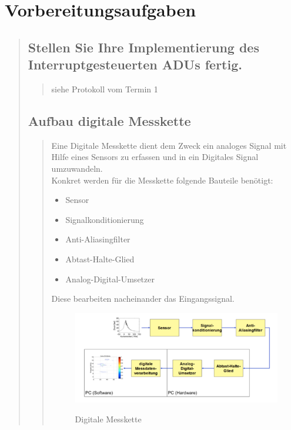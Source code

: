 \section{Vorbereitungsaufgaben}
\begin{quote}
    \subsection{Stellen Sie Ihre Implementierung des Interruptgesteuerten ADUs fertig.}
    \begin{quote}
        siehe Protokoll vom Termin 1
    \end{quote}
    
	\subsection{Aufbau digitale Messkette}
    \begin{quote}
        Eine Digitale Messkette dient dem Zweck ein analoges Signal mit Hilfe eines Sensors zu erfassen und in ein
        Digitales Signal umzuwandeln.\\
        Konkret werden für die Messkette folgende Bauteile benötigt:
        \begin{itemize}
          \item Sensor
          \item Signalkonditionierung
          \item Anti-Aliasingfilter
          \item Abtast-Halte-Glied
          \item Analog-Digital-Umsetzer
        \end{itemize}
        Diese bearbeiten nacheinander das Eingangssignal.
        \begin{figure}[H]
			\centering
				\includegraphics[scale=0.5]{DigitaleMesskette}
				   \caption{Digitale Messkette}
		\cite{DigitaleMesskette}
		\end{figure}
		\vspace{1em}
	 	

\end{quote}
\end{quote}
